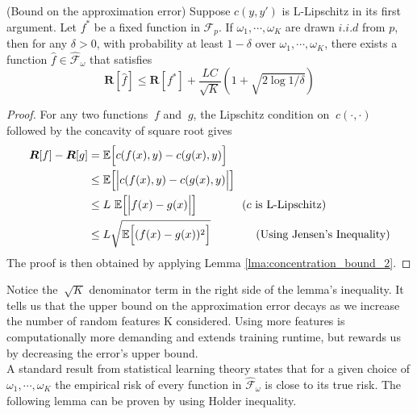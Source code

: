 \documentclass{article}
\begin{document}
\begin{lemma} (Bound on the approximation error)
    Suppose $c(y, y')$ is L-Lipschitz in its first argument. Let $f^{*}$
    be a fixed function in $\mathcal{F}_p$. If $\omega_1,\cdots, \omega_K$
    are drawn $i.i.d$ from $p$, then for any $\delta > 0$, with
    probability at least $1 - \delta$ over $\omega_1, \cdots ,\omega_K$,
    there exists a function $\hat{f} \in \mathcal{\hat{F}}_\omega$
    that satisfies
    \begin{equation*}
        \mathbf{R}[\hat{f}] \leq \mathbf{R}[f^{*}]
            + \frac{LC}{\sqrt{K}} \left(1+\sqrt{2 \log 1/\delta}\right)
    \end{equation*}
    \label{lma:approx_bound}
\end{lemma}

\begin{proof}
    For any two functions $\ f$ and $\ g$, the Lipschitz condition on $\ c(\cdot, \cdot)$ followed by the concavity of square root gives
    \begin{align*}
        \bm R[f] - \bm R[g] &= \mathbb{E} \Big[c(f(x),y) - c(g(x),y)\Big] \\
        &\leq \mathbb{E}\Big[\Big|c(f(x),y) - c(g(x),y)\Big|\Big] \\
        &\leq L\ \mathbb{E}\Big[\Big|f(x) - g(x)\Big|\Big] \qquad\qquad \text{($c$ is L-Lipschitz)}\\
        &\leq L\sqrt{\mathbb{E}\Big[(f(x)-g(x))^2\Big]} \qquad\qquad \text{(Using Jensen's Inequality)}
    \end{align*}
    The proof is then obtained by applying Lemma \ref{lma:concentration_bound_2}.
\end{proof}

Notice the $\ \sqrt{K}$ denominator term in the right side of the lemma's inequality. It tells us that the upper bound on the approximation error decays as we increase the number of random features K considered. Using more features is computationally more demanding and extends training runtime, but rewards us by decreasing the error's upper bound. \\

A standard result from statistical learning theory states that for a given choice of $\omega_1,\cdots, \omega_K$ the empirical risk of every function in $\hat{\mathcal{F}}_\omega$ is close to its true risk. The following lemma can be proven by using Holder inequality.
\end{document}
